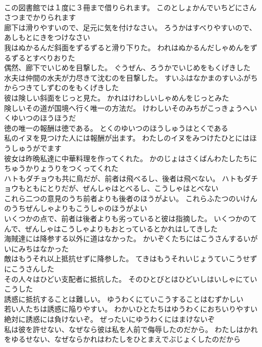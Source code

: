 \documentclass[8pt]{extreport}
\begin{document}
\begin{CJK}{UTF8}{min}
\\	この図書館では１度に３冊まで借りられます。	このとしょかんでいちどにさんさつまでかりられます 
\\	廊下は滑りやすいので、足元に気を付けなさい。	ろうかはすべりやすいので、あしもとにきをつけなさい 
\\	我はぬかるんだ斜面をずるずると滑り下りた。	われはぬかるんだしゃめんをずるずるとすべりおりた 
\\	偶然、廊下でいじめを目撃した。	ぐうぜん、ろうかでいじめをもくげきした 
\\	水夫は仲間の水夫が力尽きて沈むのを目撃した。	すいふはなかまのすいふがちからつきてしずむのをもくげきした 
\\	彼は険しい斜面をじっと見た。	かれはけわしいしゃめんをじっとみた 
\\	険しいその道が国境へ行く唯一の方法だ。	けわしいそのみちがこっきょうへいくゆいつのほうほうだ 
\\	徳の唯一の報酬は徳である。	とくのゆいつのほうしゅうはとくである 
\\	私のイヌを見つけた人には報酬が出ます。	わたしのイヌをみつけたひとにはほうしゅうがでます 
\\	彼女は昨晩私達に中華料理を作ってくれた。	かのじょはさくばんわたしたちにちゅうかりょうりをつくってくれた 
\\	ハトもダチョウも共に鳥だが、前者は飛べるし、後者は飛べない。	ハトもダチョウもともにとりだが、ぜんしゃはとべるし、こうしゃはとべない 
\\	これら二つの意見のうち前者よりも後者のほうがよい。	これらふたつのいけんのうちぜんしゃよりもこうしゃのほうがよい 
\\	いくつかの点で、前者は後者よりも劣っていると彼は指摘した。	いくつかのてんで、ぜんしゃはこうしゃよりもおとっているとかれはしてきした 
\\	海賊達には降参する以外に道はなかった。	かいぞくたちにはこうさんするいがいにみちはなかった 
\\	敵はもうそれ以上抵抗せずに降参した。	てきはもうそれいじょうていこうせずにこうさんした 
\\	その人々はひどい支配者に抵抗した。	そのひとびとはひどいしはいしゃにていこうした 
\\	誘惑に抵抗することは難しい。	ゆうわくにていこうすることはむずかしい 
\\	若い人たちは誘惑に陥りやすい。	わかいひとたちはゆうわくにおちいりやすい 
\\	絶対に誘惑には負けないぞ。	ぜったいにゆうわくにはまけないぞ 
\\	私は彼を許せない、なぜなら彼は私を人前で侮辱したのだから。	わたしはかれをゆるせない、なぜならかれはわたしをひとまえでぶじょくしたのだから 

\end{CJK}
\end{document}
